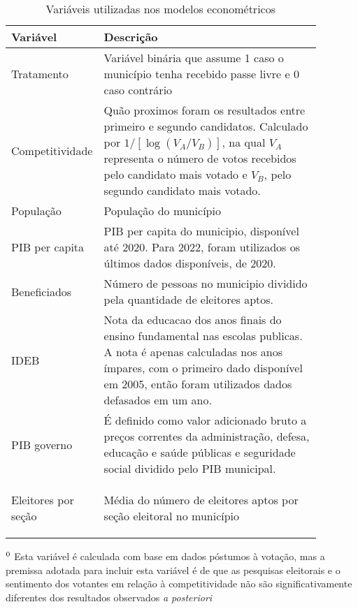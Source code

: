 \begin{table}
    \centering

    \begin{threeparttable}
        \caption{Variáveis utilizadas nos modelos econométricos}

        \begin{tabular}{m{0.18\linewidth}|m{0.7\linewidth}}
            Variável & Descrição \\
            \toprule\toprule
            Tratamento & Variável binária que assume 1 caso o município tenha recebido passe livre e 0 caso contrário \\
            \midrule[0.2pt]
            Competitividade & Quão proximos foram os resultados entre primeiro e segundo candidatos. Calculado por $1/[\log({V_A/V_B})]$, na qual $V_A$ representa o número de votos recebidos pelo candidato mais votado e $V_B$, pelo segundo candidato mais votado.\footnotemark \\
            \midrule[0.2pt]
            População & População do município \\
            \midrule[0.2pt]
            PIB per capita & PIB per capita do municipio, disponível até 2020. Para 2022, foram utilizados os últimos dados disponíveis, de 2020. \\
            \midrule[0.2pt]
            Beneficiados & Número de pessoas no municipio dividido pela quantidade de eleitores aptos. \\
            \midrule[0.2pt]
            IDEB & Nota da educacao dos anos finais do ensino fundamental nas escolas publicas. A nota é apenas calculadas nos anos ímpares, com o primeiro dado disponível em 2005, então foram utilizados dados defasados em um ano. \\
            \midrule[0.2pt]
            PIB governo & É definido como valor adicionado bruto a preços correntes da administração, defesa, educação e saúde públicas e seguridade social dividido pelo PIB municipal. \\
            \midrule[0.2pt]
            Eleitores por seção & Média do número de eleitores aptos por seção eleitoral no município

            \label{tab_variaveis}
        \end{tabular}
        \begin{tablenotes}
            \small
            \item $^{\thefootnote}$ Esta variável é calculada com base em dados póstumos à votação, mas a premissa adotada para incluir esta variável é de que as pesquisas eleitorais e o sentimento dos votantes em relação à competitividade não são significativamente diferentes dos resultados observados \textit{a posteriori}
            
        \end{tablenotes}
    \end{threeparttable}
    
\end{table}
